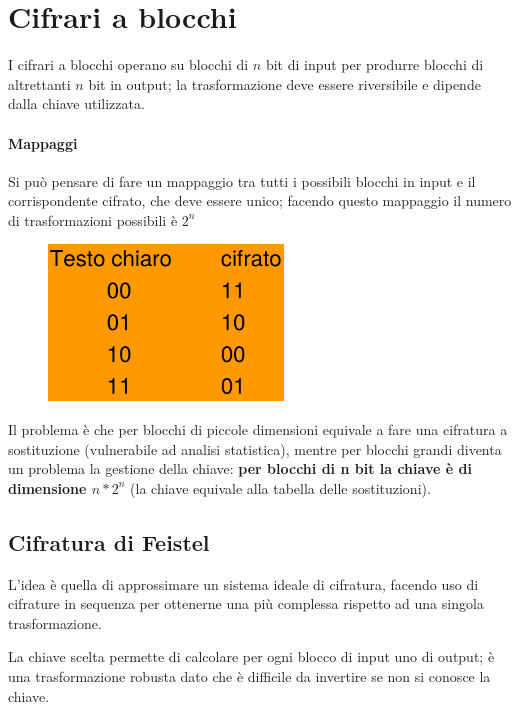 \chapter{Cifrari a blocchi}

I cifrari a blocchi operano su blocchi di $n$ bit di input per produrre 
blocchi di altrettanti $n$ bit in output; la trasformazione deve essere riversibile 
e dipende dalla chiave utilizzata.

\subsubsection{Mappaggi}

Si può pensare di fare un mappaggio tra tutti i possibili blocchi in input 
e il corrispondente cifrato, che deve essere unico; facendo questo 
mappaggio il numero di trasformazioni possibili è $2^n$

\begin{figure}[H]
    \centering
    \includegraphics[width=0.3\linewidth]{chapters/chap03/images/mappaggi.png}
\end{figure}

\noindent Il problema è che per blocchi di piccole dimensioni equivale a fare una 
cifratura a sostituzione (vulnerabile ad analisi statistica), mentre per blocchi grandi 
diventa un problema la gestione della chiave: \textbf{per blocchi di n bit la chiave è di dimensione 
$n*2^n$} (la chiave equivale alla tabella delle sostituzioni).

\section{Cifratura di Feistel}

L'idea è quella di approssimare un sistema ideale di cifratura, facendo uso di cifrature in sequenza 
per ottenerne una più complessa rispetto ad una singola trasformazione.

\noindent La chiave scelta permette di calcolare per ogni blocco di input uno di output; è 
una trasformazione robusta dato che è difficile da invertire se non si conosce la chiave.

